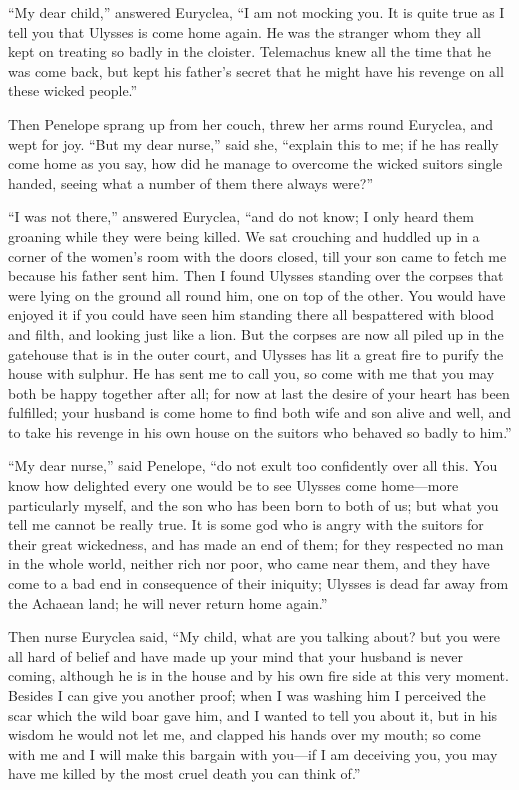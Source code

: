 “My dear child,” answered Euryclea, “I am not mocking you. It is quite true as
I tell you that Ulysses is come home again. He was the stranger whom they all
kept on treating so badly in the cloister. Telemachus knew all the time that he
was come back, but kept his father’s secret that he might have his revenge on
all these wicked people.”

Then Penelope sprang up from her couch, threw her arms round Euryclea, and wept
for joy. “But my dear nurse,” said she, “explain this to me; if he has really
come home as you say, how did he manage to overcome the wicked suitors single
handed, seeing what a number of them there always were?”

“I was not there,” answered Euryclea, “and do not know; I only heard them
groaning while they were being killed. We sat crouching and huddled up in a
corner of the women’s room with the doors closed, till your son came to fetch
me because his father sent him. Then I found Ulysses standing over the corpses
that were lying on the ground all round him, one on top of the other. You would
have enjoyed it if you could have seen him standing there all bespattered with
blood and filth, and looking just like a lion. But the corpses are now all
piled up in the gatehouse that is in the outer court, and Ulysses has lit a
great fire to purify the house with sulphur. He has sent me to call you, so
come with me that you may both be happy together after all; for now at last the
desire of your heart has been fulfilled; your husband is come home to find both
wife and son alive and well, and to take his revenge in his own house on the
suitors who behaved so badly to him.”

“My dear nurse,” said Penelope, “do not exult too confidently over all this.
You know how delighted every one would be to see Ulysses come home—more
particularly myself, and the son who has been born to both of us; but what you
tell me cannot be really true. It is some god who is angry with the suitors for
their great wickedness, and has made an end of them; for they respected no man
in the whole world, neither rich nor poor, who came near them, and they have
come to a bad end in consequence of their iniquity; Ulysses is dead far away
from the Achaean land; he will never return home again.”

Then nurse Euryclea said, “My child, what are you talking about? but you were
all hard of belief and have made up your mind that your husband is never
coming, although he is in the house and by his own fire side at this very
moment. Besides I can give you another proof; when I was washing him I
perceived the scar which the wild boar gave him, and I wanted to tell you about
it, but in his wisdom he would not let me, and clapped his hands over my mouth;
so come with me and I will make this bargain with you—if I am deceiving you,
you may have me killed by the most cruel death you can think of.”

